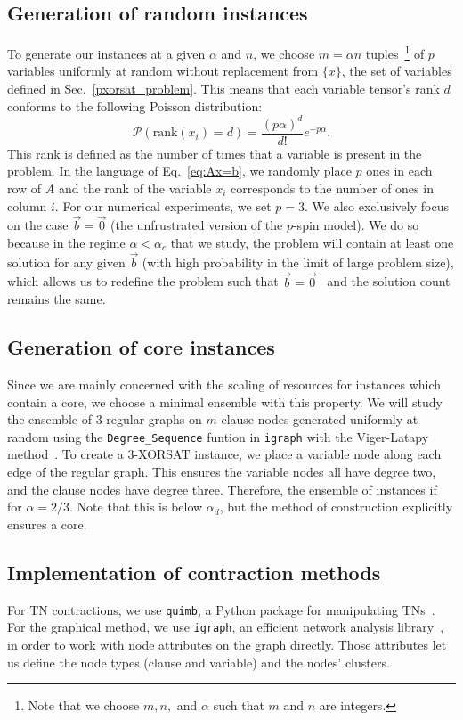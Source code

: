\subsection{Generation of random instances}
To generate our instances at a given $\alpha$ and $n$, we choose $m = \alpha n$ tuples~\footnote{Note that we choose $m,n,$ and $\alpha$ such that $m$ and $n$ are integers.} of $p$ variables uniformly at random without replacement from $\{x\}$, the set of variables defined in Sec.~\ref{pxorsat_problem}.
This means that each variable tensor's rank $d$ conforms to the following Poisson distribution:
\begin{equation}\label{eq:poisson}
    \mathcal{P}(\text{rank}(x_i) = d) = \frac{(p\alpha)^d}{d!} e^{-p\alpha}.
\end{equation}
This rank is defined as the number of times that a variable is present in the problem.
In the language of Eq.~\ref{eq:Ax=b}, we randomly place $p$ ones in each row of $A$ and the rank of the variable $x_i$ corresponds to the number of ones in column $i$.
For our numerical experiments, we set $p=3$.
We also exclusively focus on the case $\vec{b} = \vec{0}$ (the unfrustrated version of the $p$-spin model).
We do so because in the regime $\alpha < \alpha_c$ that we study, the problem will contain at least one solution for any given $\vec{b}$ (with high probability in the limit of large problem size), which allows us to redefine the problem such that $\vec{b} = \vec{0}$~\cite{mezard_alternative_2002, braunstein_complexity_2002} and the solution count remains the same.

\subsection{Generation of core instances}\label{Core}
Since we are mainly concerned with the scaling of resources for instances which contain a core, we choose a minimal ensemble with this property.
We will study the ensemble of $3$-regular graphs on $m$ clause nodes generated uniformly at random using the \verb|Degree_Sequence| funtion in \verb|igraph| with the Viger-Latapy method~\cite{viger_efficient_2016}.
To create a $3$-XORSAT instance, we place a variable node along each edge of the regular graph.
This ensures the variable nodes all have degree two, and the clause nodes have degree three.
Therefore, the ensemble of instances if for $\alpha = 2/3$.
Note that this is below $\alpha_d$, but the method of construction explicitly ensures a core.

\subsection{Implementation of contraction methods}
For TN contractions, we use \verb|quimb|, a Python package for manipulating TNs~\cite{gray2018quimb}.
For the graphical method, we use \verb|igraph|, an efficient network analysis library~\cite{csardi_igraph_nodate}, in order to work with node attributes on the graph directly.
Those attributes let us define the node types (clause and variable) and the nodes' clusters.

